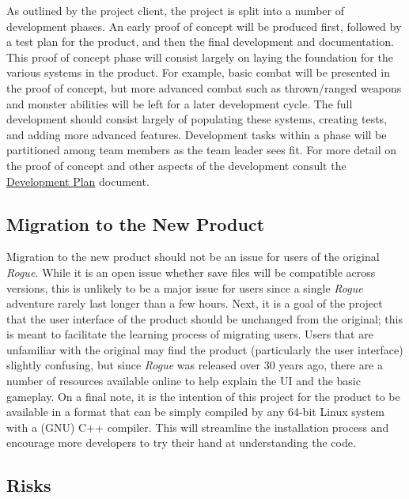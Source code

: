 \documentclass[12pt, titlepage]{article}
\begin{document}
	As outlined by the project client, the project is split into a number of development phases.  An early proof of concept will be produced first, followed by a test plan for the product, and then the final development and documentation.  This proof of concept phase will consist largely on laying the foundation for the various systems in the product.  For example, basic combat will be presented in the proof of concept, but more advanced combat such as thrown/ranged weapons and monster abilities will be left for a later development cycle.  The full development should consist largely of populating these systems, creating tests, and adding more advanced features.  Development tasks within a phase will be partitioned among team members as the team leader sees fit.  For more detail on the proof of concept and other aspects of the development consult the \href{../DevelopmentPlan/DevelopmentPlan.pdf}{Development Plan} document.

	\subsection{Migration to the New Product}

	Migration to the new product should not be an issue for users of the original \textit{Rogue}.  While it is an open issue whether save files will be compatible across versions, this is unlikely to be a major issue for users since a single \textit{Rogue} adventure rarely last longer than a few hours. Next, it is a goal of the project that the user interface of the product should be unchanged from the original; this is meant to facilitate the learning process of migrating users.  Users that are unfamiliar with the original may find the product (particularly the user interface) slightly confusing, but since \textit{Rogue} was released over 30 years ago, there are a number of resources available online to help explain the UI and the basic gameplay.  On a final note, it is the intention of this project for the product to be available in a format that can be simply compiled by any 64-bit Linux system with a (GNU) C++ compiler.  This will streamline the installation process and encourage more developers to try their hand at understanding the code.

	\subsection{Risks}
\end{document}
